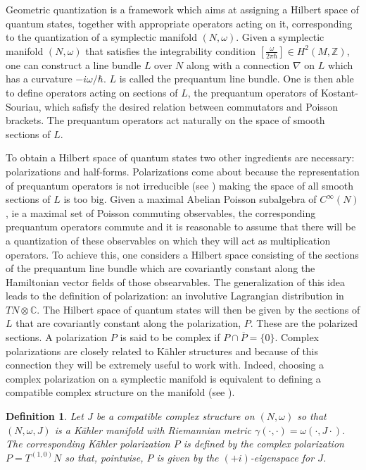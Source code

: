 \documentclass[a4paper,11pt]{article}
\newtheorem{definition}{Definition}
\begin{document}
Geometric quantization is a framework which aims at assigning a Hilbert space of quantum states, 
together with appropriate operators acting on it, corresponding to the quantization of a symplectic manifold 
$(N,\omega)$.  Given a symplectic manifold $(N,\omega)$ that satisfies the integrability condition $\left[\tfrac{\omega}{2\pi \hbar}\right]\in H^{2}(M,\mathbb{Z})$, one can construct a line bundle $L$ over $N$ along with a connection $\nabla$ on $L$ which has a curvature $-i\omega/\hbar$. $L$ is called the prequantum line bundle. One is then able to define operators acting on sections of $L$, the prequantum operators of Kostant-Souriau, which safisfy the desired relation between commutators and Poisson brackets.  The prequantum operators act naturally on the space of smooth sections of $L$.

To obtain a Hilbert space of quantum states two other ingredients are necessary: polarizations and half-forms. Polarizations come about because the representation of prequantum operators is not irreducible (see \cite{BrianHall}) making the space of all smooth sections of $L$ is too big. Given a maximal Abelian Poisson subalgebra of $C^{\infty}(N)$, ie a maximal set of Poisson commuting observables, the corresponding prequantum operators commute and it is reasonable to assume that there will be a quantization of these observables on which they will act as multiplication operators. To achieve this, one considers a Hilbert space consisting of the sections of the prequantum line bundle which are covariantly 
constant along the Hamiltonian vector fields of those obsearvables. The generalization of this idea leads to the definition of polarization: an involutive Lagrangian distribution in $TN\otimes \mathbb{C}.$
The Hilbert space of quantum states will then be given by the sections of $L$ that are covariantly constant along the polarization, $P$. These are the polarized sections. A polarization $P$ is said to be complex if $P\cap \overline{P}=\{0\}$. Complex polarizations are closely related to Kähler structures and because of this connection they will be extremely useful to work with. Indeed, choosing a complex polarization on a symplectic manifold is equivalent to defining a compatible complex structure on the manifold (see \cite{BrianHall, Woodhouse}).

\begin{definition}Let $J$ be a compatible complex structure on $(N,\omega)$ so that $(N,\omega, J)$ is a K\"ahler manifold with Riemannian metric $\gamma (\cdot, \cdot) = \omega (\cdot, J\cdot).$ The corresponding K\"ahler polarization $P$ is defined by the complex polarization $P = T^{(1,0)}N$ so that, pointwise, $P$ is given by the  $(+i)$-eigenspace for $J$.
\end{definition}
\end{document}
